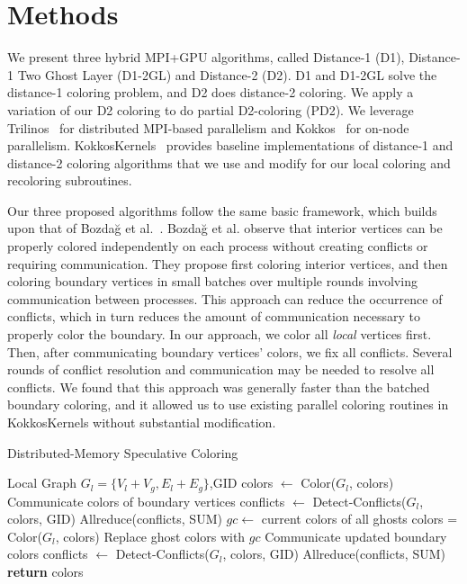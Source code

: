 \section{Methods}

We present three hybrid MPI+GPU algorithms, called Distance-1 (D1), Distance-1 Two Ghost Layer (D1-2GL) and Distance-2 (D2). D1 and D1-2GL solve the distance-1 coloring problem, and D2 does distance-2 coloring.
We apply a variation of our D2 coloring to do partial D2-coloring (PD2).
We leverage Trilinos~\cite{IAB:heroux2005overview} for distributed MPI-based 
parallelism and Kokkos~\cite{IAB:edwards2014kokkos} for on-node parallelism. KokkosKernels~\cite{kokkoskernels} provides baseline implementations of distance-1 and distance-2 coloring algorithms that we use and modify for our local coloring and recoloring subroutines.

Our three proposed algorithms follow the same basic framework, which builds upon that of Bozda{\u{g}} et al.~\cite{IAB:bozdaug2008framework}.
Bozda{\u{g}} et al. observe that interior vertices can be properly colored independently on each process without creating conflicts or requiring communication.
They propose first coloring interior vertices, and then coloring boundary vertices in small batches over multiple rounds involving communication between processes. 
This approach can reduce the occurrence of conflicts, which in turn reduces the amount of communication necessary to properly color the boundary. 
In our approach, we color all \emph{local} vertices first.
Then, after communicating boundary vertices' 
colors, we fix all conflicts.  Several
rounds of conflict resolution and communication may be needed to resolve all
conflicts.
We found that this approach was generally faster than the batched boundary
coloring, and it allowed us to use existing parallel coloring routines in KokkosKernels without substantial modification.

\begin{algorithm}[!htb]
  \caption{Distributed-Memory Speculative Coloring}
  \label{IAB:alg:overview}
  \begin{algorithmic}
     {\newline \hspace*{0.5pc} Local Graph $G_l=\{V_l+V_g,E_l+E_g\}$,GID}
      \State colors $\gets$ Color($G_l$, colors) 
      \State Communicate colors of boundary vertices
      \State conflicts $\gets$ Detect-Conflicts($G_l$, colors, GID)
      \State Allreduce(conflicts, SUM) 
	\State $\mathit{gc} \gets$ current colors of all ghosts
	\State colors = Color($G_l$, colors) 
        \State {}
	\State Replace ghost colors with $\mathit{gc}$
        \State Communicate updated boundary colors
        \State conflicts $\gets$ Detect-Conflicts($G_l$, colors, GID)
        \State Allreduce(conflicts, SUM) 
      \EndWhile
      \State \textbf{return} colors
    \EndProcedure
  \end{algorithmic}
\end{algorithm}

